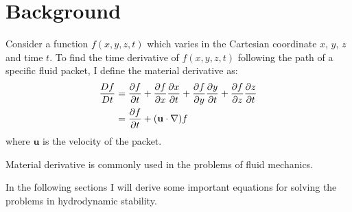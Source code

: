 \chapter{Background}
Consider a function $f(x,y,z,t)$ which varies in the Cartesian
coordinate $x$, $y$, $z$ and time $t$. To find the time derivative
of $f(x,y,z,t)$ following the path of a specific fluid packet, I
define the material derivative as:
\begin{align}
    \frac{Df}{Dt} &= \frac{\partial f}{\partial t}+\frac{\partial f}{\partial x}
    \frac{\partial x}{\partial t}+\frac{\partial f}{\partial
    y}\frac{\partial y}{\partial t}+\frac{\partial f}{\partial
    z}\frac{\partial z}{\partial t}\notag\\
    &= \frac{\partial f}{\partial
    t}+(\mathbf{u}\cdot\nabla)f
\end{align}
where $\mathbf{u}$ is the velocity of the packet.

Material derivative is commonly used in the problems of fluid
mechanics.


In the following sections I will derive some important equations for
solving the problems in hydrodynamic stability.
